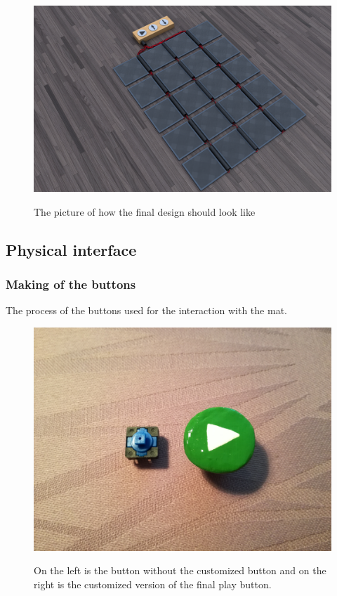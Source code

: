 \begin{figure}[H]
	\centering
	\includegraphics[width=0.7\linewidth]{figure/Design/finaldesign}
	\label{fig:finaldesign}
	\caption{The picture of how the final design should look like}
	
\end{figure}


\subsection{Physical interface}

\subsubsection{Making of the buttons}

The process of the buttons used for the interaction with the mat.

\begin{figure}[H]
	\centering
	\includegraphics[width=0.7\linewidth]{figure/Design/buttons}
	\label{fig:buttons}
	\caption{On the left is the button without the customized button and on the right is the customized version of the final play button.}
	
\end{figure}

